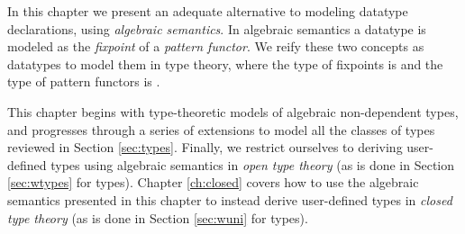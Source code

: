 \documentclass[12pt]{report}
\newcommand{\refch}[1]{Chapter \ref{ch:#1}}
\newcommand{\refsec}[1]{Section \ref{sec:#1}}
\newcommand{\AgdaData}[1]{\AgdaDatatype{#1}}
\theoremstyle{definition}
\theoremstyle{remark}
\numberwithin{definition}{section}
\numberwithin{equation}{section}
\numberwithin{proposition}{section}
\numberwithin{conjecture}{section}
\numberwithin{theorem}{section}
\numberwithin{lemma}{section}
\numberwithin{corollary}{section}
\numberwithin{example}{section}
\numberwithin{remark}{section}
\begin{document}
In this chapter we present an adequate alternative to modeling
datatype declarations, using \textit{algebraic semantics}. In
algebraic semantics a datatype is modeled as the \textit{fixpoint}
of a \textit{pattern functor}. We reify these two concepts as
datatypes to model them in type theory, where the type of fixpoints is
\AgdaData{μ} and the type of pattern functors is \AgdaData{Desc}.

This chapter begins with type-theoretic models of algebraic
non-dependent types, and progresses through a series of
extensions to model all the classes of types reviewed in
\refsec{types}. Finally, we restrict ourselves to deriving
user-defined types using algebraic semantics in
\textit{open type theory} (as is done in \refsec{wtypes} for
\AgdaData{W} types).
\refch{closed} covers how to use the
algebraic semantics presented in this chapter to instead derive
user-defined types in \textit{closed type theory} (as is done
in \refsec{wuni} for \AgdaData{W} types).







\end{document}
